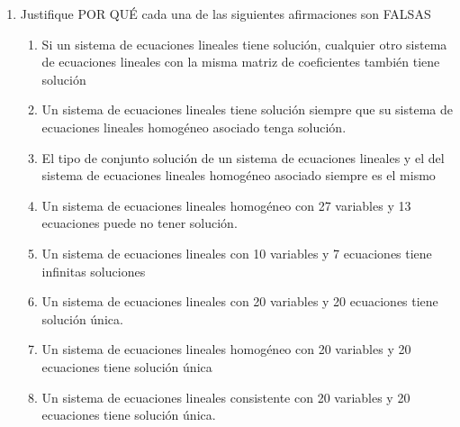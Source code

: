 \documentclass{article}
\begin{document}
\begin{enumerate}
    \item Justifique POR QUÉ cada una de las siguientes afirmaciones son FALSAS
        \begin{enumerate}[label=\listAlph]
			\item Si un sistema de ecuaciones lineales tiene solución, cualquier otro sistema de ecuaciones lineales con la misma matriz de coeficientes también tiene solución
			\item Un sistema de ecuaciones lineales tiene solución siempre que su sistema de ecuaciones lineales homogéneo asociado tenga solución.
			\item El tipo de conjunto solución de un sistema de ecuaciones lineales y el del sistema de ecuaciones lineales homogéneo asociado siempre es el mismo
			\item Un sistema de ecuaciones lineales homogéneo con 27 variables y 13 ecuaciones puede no tener solución.
			\item Un sistema de ecuaciones lineales con 10 variables y 7 ecuaciones tiene infinitas soluciones
			\item Un sistema de ecuaciones lineales con 20 variables y 20 ecuaciones tiene solución única.
			\item Un sistema de ecuaciones lineales homogéneo con 20 variables y 20 ecuaciones tiene solución única
			\item Un sistema de ecuaciones lineales consistente con 20 variables y 20 ecuaciones tiene solución única.
        \end{enumerate}
\end{enumerate}
\end{document}
